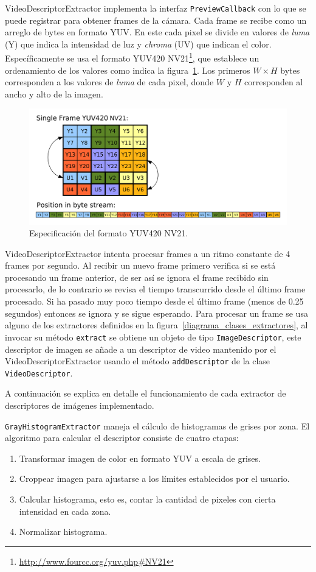 VideoDescriptorExtractor implementa la interfaz \texttt{PreviewCallback} con lo que se puede registrar para obtener frames de la cámara. Cada frame se recibe como un arreglo de bytes en formato YUV. En este cada pixel se divide en valores de \emph{luma} (Y) que indica la intensidad de luz y \emph{chroma} (UV) que indican el color. Específicamente se usa el formato YUV420 NV21\footnote{\url{http://www.fourcc.org/yuv.php\#NV21}}, que establece un ordenamiento de los valores como indica la figura~\ref{formato_yuv}. Los primeros $W \times H$ bytes corresponden a los valores de \emph{luma} de cada pixel, donde $W$ y $H$ corresponden al ancho y alto de la imagen.  
	\begin{figure}[!h]
		\centering
		\includegraphics[scale=0.3]{imagenes/cap4/yuv.png}
		\caption{Especificación del formato YUV420 NV21.}
		\label{formato_yuv}
	\end{figure}

VideoDescriptorExtractor intenta procesar frames a un ritmo constante de 4 frames por segundo. Al recibir un nuevo frame primero verifica si se está procesando un frame anterior, de ser así se ignora el frame recibido sin procesarlo, de lo contrario se revisa el tiempo transcurrido desde el último frame procesado. Si ha pasado muy poco tiempo desde el último frame (menos de 0.25 segundos) entonces se ignora y se sigue esperando. Para procesar un frame se usa alguno de los extractores definidos en la figura~\ref{diagrama_clases_extractores}, al invocar su método \texttt{extract} se obtiene un objeto de tipo \texttt{ImageDescriptor}, este descriptor de imagen se añade a un descriptor de video mantenido por el VideoDescriptorExtractor usando el método \texttt{addDescriptor} de la clase \texttt{VideoDescriptor}.

A continuación se explica en detalle el funcionamiento de cada extractor de descriptores de imágenes implementado.

\texttt{GrayHistogramExtractor} maneja el cálculo de histogramas de grises por zona. El algoritmo para calcular el descriptor consiste de cuatro etapas:
\begin{enumerate}
\item Transformar imagen de color en formato YUV a escala de grises.
\item Croppear imagen para ajustarse a los límites establecidos por el usuario.
\item Calcular histograma, esto es, contar la cantidad de pixeles con cierta intensidad en cada zona.
\item Normalizar histograma.
\end{enumerate}

